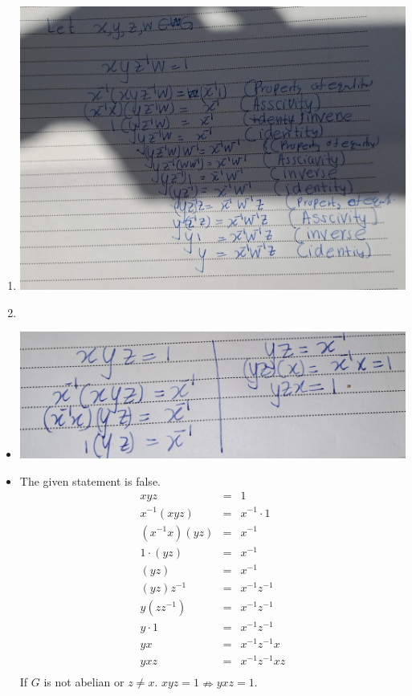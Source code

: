 \documentclass[
]{book}
\providecommand{\tightlist}{%
  \setlength{\itemsep}{0pt}\setlength{\parskip}{0pt}}
\theoremstyle{definition}
\theoremstyle{definition}
\theoremstyle{definition}
\theoremstyle{definition}
\theoremstyle{remark}
\begin{document}
\begin{enumerate}
\def\labelenumi{\alph{enumi}.}
\tightlist
\item
  \includegraphics{figures/ch_2/fig17.jpg}
\item
\end{enumerate}

\begin{itemize}
\tightlist
\item
  \hfill\break
  \includegraphics{figures/ch_2/fig18.jpg}
\item
  The given statement is false.
  \begin{eqnarray}
          xyz&=&1\\
  x^{-1}(xyz)&=&x^{-1} \cdot 1\\
  (x^{-1}x)(yz)&=&x^{-1}\\
  1 \cdot(yz)&=&x^{-1}\\
  (yz)&=&x^{-1}\\
  (yz)z^{-1}&=&x^{-1}z^{-1}\\
  y(zz^{-1})&=&x^{-1}z^{-1}\\
  y \cdot 1&=&x^{-1}z^{-1}\\
  yx&=&x^{-1}z^{-1}x\\
  yxz&=&x^{-1}z^{-1}xz\\
  \end{eqnarray}
  If \(G\) is not abelian or \(z\neq x\). \(xyz=1 \nRightarrow yxz=1\).
\end{itemize}
\end{document}
